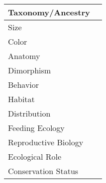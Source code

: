 \begin{center}
\begin{longtabu} to 

	\hline
	Taxonomy/Ancestry &
	
	 \\
	\hline
	Size & 
	
	\\
	\hline
	Color &
	
	 \\
	\hline
	Anatomy &
	
	 \\
	\hline
	Dimorphism & 
	
	\\
	\hline
	Behavior & 
	
	\\
	\hline
	Habitat & 
	
	\\
	\hline
	Distribution & 
	
	\\
	\hline
	Feeding Ecology & 
	
	\\
	\hline
	Reproductive Biology & 
	
	\\
	\hline
	Ecological Role &
	
	\\
	\hline
	Conservation Status & 
	
	\\
	\hline
\end{longtabu}
\end{center}